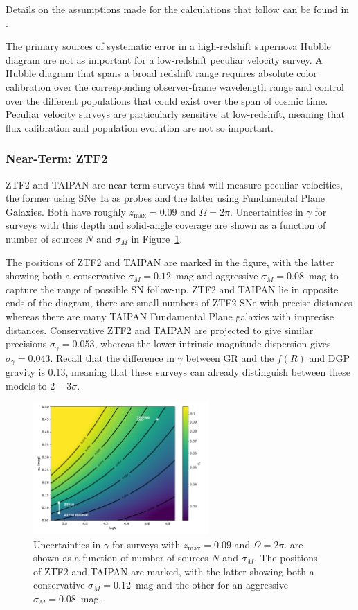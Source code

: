 \documentclass[11pt, oneside]{article}   	%
\begin{document}
Details on the assumptions made for the calculations that follow can be found in \cite{2019BAAS...51c.140K}.

The primary sources of systematic error in a high-redshift supernova Hubble diagram are not as important for a low-redshift
peculiar velocity survey.  A Hubble diagram that spans a broad redshift range requires absolute color calibration over the corresponding observer-frame
wavelength range and control over the different populations that could exist over the span of cosmic time.  Peculiar velocity surveys are
particularly sensitive at low-redshift,  meaning that flux calibration and population evolution are not so important.

\subsubsection{Near-Term: ZTF2}
ZTF2 and TAIPAN are near-term surveys that will measure peculiar velocities, the former using SNe~Ia as probes and the latter
using Fundamental Plane Galaxies.  Both have roughly
 $z_{\text{max}}=0.09$ and $\Omega = 2\pi$.
Uncertainties in $\gamma$ for surveys with this depth and solid-angle coverage 
are shown as a function of number of sources $N$ and $\sigma_M$ in Figure~\ref{surface:fig}. 

The positions of ZTF2 and TAIPAN are marked
in the figure, with the latter showing both  a conservative $\sigma_M=0.12$~mag and aggressive $\sigma_M=0.08$~mag
to capture the range of possible SN follow-up.
ZTF2 and TAIPAN lie in opposite ends of the diagram, there are small numbers of ZTF2 SNe with precise distances
whereas there are many TAIPAN Fundamental Plane galaxies with imprecise distances. 
Conservative ZTF2 and TAIPAN
are projected to give similar precisions $\sigma_ \gamma = 0.053$, whereas  the lower intrinsic magnitude dispersion  gives
$\sigma_ \gamma = 0.043$.  
Recall that the difference in $\gamma$  between GR and the $f(R)$ and DGP gravity is 0.13, meaning that these surveys
can already distinguish between these models to $2-3 \sigma$.


\begin{figure}
\centering
\includegraphics[width=0.6\textwidth]{src/surface1.pdf}
\caption{Uncertainties in $\gamma$ for surveys  with $z_{\text{max}}=0.09$ and $\Omega = 2\pi$.
are shown as a function of number of sources $N$ and $\sigma_M$.  The positions of ZTF2 and TAIPAN are marked,
with the latter showing both  a conservative $\sigma_M=0.12$~mag and the other for an aggressive $\sigma_M=0.08$~mag.
\label{surface:fig}}
\end{figure}
\end{document}

